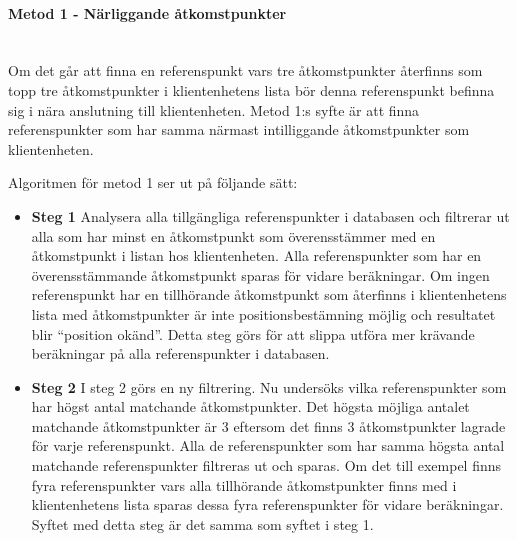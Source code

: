 \documentclass[a4paper,12pt]{article}
\begin{document}
 \paragraph{Metod 1 - Närliggande åtkomstpunkter}
 \leavevmode\\
 Om det går att finna en referenspunkt vars tre åtkomstpunkter återfinns som topp tre åtkomstpunkter i klientenhetens lista bör denna referenspunkt befinna sig i nära anslutning till klientenheten.
 Metod 1:s syfte är att finna referenspunkter som har samma närmast intilliggande åtkomstpunkter som klientenheten.

 Algoritmen för metod 1 ser ut på följande sätt:

   \begin{itemize}
     \item \textbf{Steg 1}
     \newline
     Analysera alla tillgängliga referenspunkter i databasen och filtrerar ut alla som har minst en åtkomstpunkt som överensstämmer med en åtkomstpunkt i listan hos klientenheten. Alla referenspunkter som har en överensstämmande åtkomstpunkt sparas för vidare beräkningar. Om ingen referenspunkt har en tillhörande åtkomstpunkt som återfinns i klientenhetens lista med åtkomstpunkter är inte positionsbestämning möjlig och resultatet blir ``position okänd''.
     Detta steg görs för att slippa utföra mer krävande beräkningar på alla referenspunkter i databasen.
     \item \textbf{Steg 2}
     \newline
     I steg 2 görs en ny filtrering. Nu undersöks vilka referenspunkter som har högst antal matchande åtkomstpunkter. Det högsta möjliga antalet matchande åtkomstpunkter är 3 eftersom det finns 3 åtkomstpunkter lagrade för varje referenspunkt. Alla de referenspunkter som har samma högsta antal matchande referenspunkter filtreras ut och sparas.
     Om det till exempel finns fyra referenspunkter vars alla tillhörande åtkomstpunkter finns med i klientenhetens lista sparas dessa fyra referenspunkter för vidare beräkningar. Syftet med detta steg är det samma som syftet i steg 1.


\end{itemize}
\end{document}
